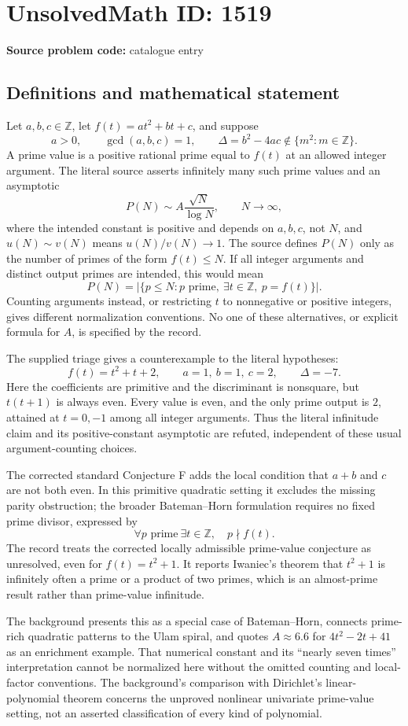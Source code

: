 \documentclass[11pt]{article}
\newcommand{\Z}{\mathbb{Z}}
\begin{document}
\section*{UnsolvedMath ID: 1519}
\textbf{Source problem code:} catalogue entry
\subsection{Definitions and mathematical statement}
Let $a,b,c\in\Z$, let $f(t)=at^2+bt+c$, and suppose
\[
 a>0,\qquad \gcd(a,b,c)=1,\qquad
 \Delta=b^2-4ac\notin\{m^2:m\in\Z\}.
\]
A prime value is a positive rational prime equal to $f(t)$ at an allowed integer argument. The literal source asserts infinitely many such prime values and an asymptotic
\[
 P(N)\sim A\frac{\sqrt N}{\log N},\qquad N\longrightarrow\infty,
\]
where the intended constant is positive and depends on $a,b,c$, not $N$, and $u(N)\sim v(N)$ means $u(N)/v(N)\to1$. The source defines $P(N)$ only as the number of primes of the form $f(t)\le N$. If all integer arguments and distinct output primes are intended, this would mean
\[
 P(N)=|\{p\le N:p\text{ prime},\ \exists t\in\Z,\ p=f(t)\}|.
\]
Counting arguments instead, or restricting $t$ to nonnegative or positive integers, gives different normalization conventions. No one of these alternatives, or explicit formula for $A$, is specified by the record.

The supplied triage gives a counterexample to the literal hypotheses:
\[
 f(t)=t^2+t+2,\qquad a=1,\ b=1,\ c=2,\qquad \Delta=-7.
\]
Here the coefficients are primitive and the discriminant is nonsquare, but $t(t+1)$ is always even. Every value is even, and the only prime output is $2$, attained at $t=0,-1$ among all integer arguments. Thus the literal infinitude claim and its positive-constant asymptotic are refuted, independent of these usual argument-counting choices.

The corrected standard Conjecture F adds the local condition that $a+b$ and $c$ are not both even. In this primitive quadratic setting it excludes the missing parity obstruction; the broader Bateman--Horn formulation requires no fixed prime divisor, expressed by
\[
 \forall p\text{ prime}\ \exists t\in\Z,\quad p\nmid f(t).
\]
The record treats the corrected locally admissible prime-value conjecture as unresolved, even for $f(t)=t^2+1$. It reports Iwaniec's theorem that $t^2+1$ is infinitely often a prime or a product of two primes, which is an almost-prime result rather than prime-value infinitude.

The background presents this as a special case of Bateman--Horn, connects prime-rich quadratic patterns to the Ulam spiral, and quotes $A\approx6.6$ for $4t^2-2t+41$ as an enrichment example. That numerical constant and its ``nearly seven times'' interpretation cannot be normalized here without the omitted counting and local-factor conventions. The background's comparison with Dirichlet's linear-polynomial theorem concerns the unproved nonlinear univariate prime-value setting, not an asserted classification of every kind of polynomial.
\end{document}
